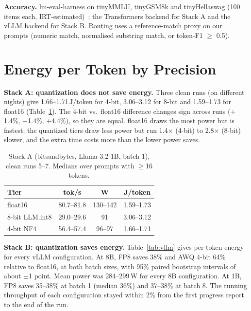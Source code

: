 \documentclass[conference]{IEEEtran}
\begin{document}
\textbf{Accuracy.} lm-eval-harness on tinyMMLU, tinyGSM8k and tinyHellaswag (100 items each, IRT-estimated)~\cite{polo2024tiny}; the Transformers backend for Stack A and the vLLM backend for Stack B. Routing uses a reference-match proxy on our prompts (numeric match, normalised substring match, or token-F1 $\geq$ 0.5).

\section{Energy per Token by Precision}
\label{sec:results}

\textbf{Stack A: quantization does not save energy.} Three clean runs (on different nights) give 1.66--1.71\,J/token for 4-bit, 3.06--3.12 for 8-bit and 1.59--1.73 for float16 (Table~\ref{tab:bnb}). The 4-bit vs.\ float16 difference changes sign across runs ($+$1.4\%, $-$1.4\%, $+$4.4\%), so they are equal. float16 draws the most power but is fastest; the quantized tiers draw less power but run 1.4$\times$ (4-bit) to 2.8$\times$ (8-bit) slower, and the extra time costs more than the lower power saves.

\begin{table}[t]
\caption{Stack A (bitsandbytes, Llama-3.2-1B, batch 1), clean runs 5--7. Medians over prompts with $\geq$16 tokens.}
\label{tab:bnb}
\centering\small
\begin{tabular}{lccc}
\toprule
Tier & tok/s & W & J/token \\
\midrule
float16 & 80.7--81.8 & 130--142 & 1.59--1.73 \\
8-bit LLM.int8 & 29.0--29.6 & 91 & 3.06--3.12 \\
4-bit NF4 & 56.4--57.4 & 96--97 & 1.66--1.71 \\
\bottomrule
\end{tabular}
\end{table}

\textbf{Stack B: quantization saves energy.} Table~\ref{tab:vllm} gives per-token energy for every vLLM configuration. At 8B, FP8 saves 38\% and AWQ 4-bit 64\% relative to float16, at both batch sizes, with 95\% paired bootstrap intervals of about $\pm$1 point. Mean power was 284--299\,W for every 8B configuration. At 1B, FP8 saves 35--38\% at batch 1 (median 36\%) and 37--38\% at batch 8. The running throughput of each configuration stayed within 2\% from the first progress report to the end of the run.
\end{document}
